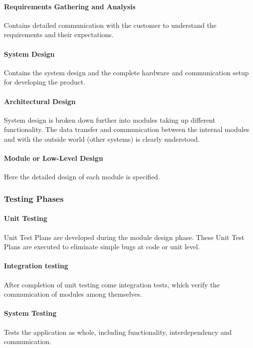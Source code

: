 \documentclass[main.tex]{subfiles}
\begin{document}
\paragraph{Requirements Gathering and Analysis}
Contains detailed communication with the customer to understand the requirements and their expectations.

\paragraph{System Design}
Contains the system design and the complete hardware and communication setup for developing the product.

\paragraph{Architectural Design}
System design is broken down further into modules taking up different functionality. The data transfer and communication between the internal modules and with the outside world (other systems) is clearly understood.

\paragraph{Module or Low-Level Design} Here the detailed design of each module is specified.

\subsubsection{Testing Phases}

\paragraph{Unit Testing}
Unit Test Plans are developed during the module design phase. These Unit Test Plans are executed to eliminate simple bugs at code or unit level.

\paragraph{Integration testing}
After completion of unit testing come integration tests, which verify the communication of modules among themselves.

\paragraph{System Testing}
Tests the application as whole, including functionality, interdependency and communication.
\end{document}
